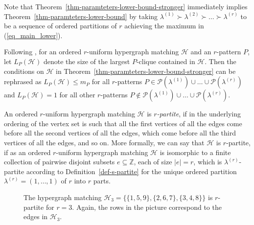 \documentclass{aic}
\theoremstyle{definition}
\numberwithin{equation}{section}
\numberwithin{figure}{section}
\newcommand{\su}{\subseteq}
\newcommand{\Z}{\mathbb{Z}}
\newcommand{\HH}{\mathcal{H}}
\newcommand{\PP}{\mathcal{P}}
\begin{document}
Note that Theorem~\ref{thm-paramteters-lower-bound-stronger} immediately implies Theorem~\ref{thm-paramteters-lower-bound} by taking $\lambda^{(1)} \succ \lambda^{(2)} \succ \ldots \succ \lambda^{(r)}$ to be a sequence of ordered partitions of $r$ achieving the maximum in (\ref{eq_main_lower}).

Following \cite{AJKS}, for an ordered $r$-uniform hypergraph matching $\HH$ and an $r$-pattern $P$, let $L_P(\HH)$ denote the size of the largest $P$-clique contained in $\HH$. Then the conditions on $\HH$ in Theorem~\ref{thm-paramteters-lower-bound-stronger} can be rephrased as $L_P(\HH)\le m_P$ for all $r$-patterns $P\in \PP(\lambda^{(1)})\cup\dots\cup \PP(\lambda^{(r)})$ and $L_P(\HH)=1$ for all other $r$-patterns $P\not\in \PP(\lambda^{(1)})\cup\dots\cup \PP(\lambda^{(r)})$.

An ordered $r$-uniform hypergraph matching $\HH$ is \emph{$r$-partite}, if in the underlying ordering of the vertex set is such that all the first vertices of all the edges come before all the second vertices of all the edges, which come before all the third vertices of all the edges, and so on. More formally, we can say that $\HH$ is $r$-partite, if as an ordered $r$-uniform hypergraph matching $\HH$ is isomorphic to a finite collection of pairwise disjoint subsets $e\su \Z$, each of size $|e|=r$, which is $\lambda^{(r)}$-partite according to Definition~\ref{def-s-partite} for the unique ordered partition $\lambda^{(r)}=(1,\dots,1)$ of $r$ into $r$ parts.

\begin{figure}
    \centering
    \caption{The hypergraph matching $\HH_3 = \{ \{1,5,9\}, \{2,6,7\},\{3, 4,8\} \}$ is $r$-partite for $r=3$. Again, the rows in the picture correspond to the edges in $\HH_3$.}
    \label{fig:figure-example-r-partite}
\end{figure}
\end{document}
